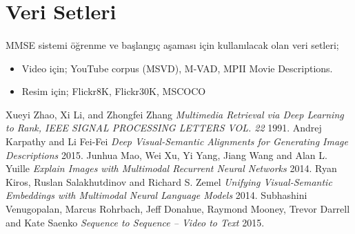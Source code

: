 \documentclass[11pt,a4paper]{article}
\begin{document}
\newpage
\section{Veri Setleri}
\paragraph{}
MMSE sistemi öğrenme ve başlangıç aşaması için kullanılacak olan veri setleri;
\begin{itemize}
\item Video için; YouTube corpus (MSVD), M-VAD, MPII Movie Descriptions. 
\item Resim için; Flickr8K, Flickr30K, MSCOCO
\end{itemize}

\newpage

\begin{thebibliography}{1}
   
 Xueyi Zhao, Xi Li, and Zhongfei Zhang {\em Multimedia Retrieval via Deep Learning to Rank, IEEE SIGNAL PROCESSING LETTERS VOL. 22}  1991.
 Andrej Karpathy and Li Fei-Fei {\em Deep Visual-Semantic Alignments for Generating Image Descriptions}  2015.
 Junhua Mao, Wei Xu, Yi Yang, Jiang Wang and Alan L. Yuille {\em Explain Images with Multimodal Recurrent Neural Networks}  2014.
 Ryan Kiros, Ruslan Salakhutdinov and Richard S. Zemel {\em Unifying Visual-Semantic Embeddings with Multimodal Neural Language Models}  2014.
 Subhashini Venugopalan, Marcus Rohrbach, Jeff Donahue, Raymond Mooney, Trevor Darrell and Kate Saenko {\em Sequence to Sequence – Video to Text} 2015.

\end{thebibliography}
\end{document}
